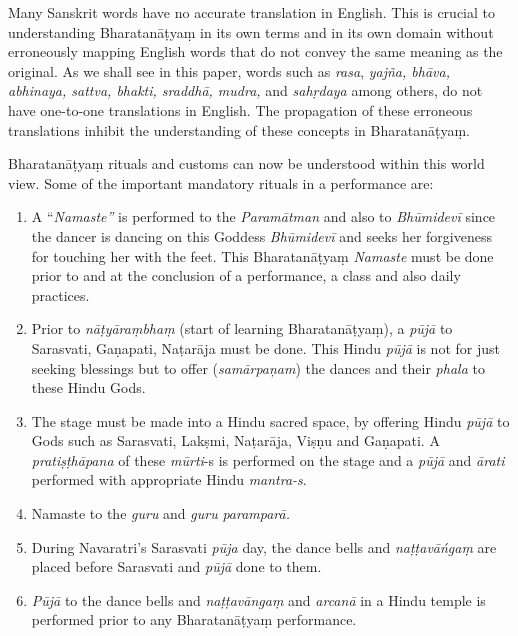 Many Sanskrit words have no accurate translation in English. This is crucial to understanding Bharatanāṭyaṃ in its own terms and in its own domain without erroneously mapping English words that do not convey the same meaning as the original. As we shall see in this paper, words such as \textit{rasa}, \textit{yajña, bhāva, abhinaya, sattva, bhakti, sraddhā, mudra,} and \textit{sahṛdaya} among others, do not have one-to-one translations in English. The propagation of these erroneous translations inhibit the understanding of these concepts in Bharatanāṭyaṃ.

Bharatanāṭyaṃ rituals and customs can now be understood within this world view. Some of the important mandatory rituals in a performance are:

\begin{enumerate}[{\rm 1)}]
\itemsep=0pt
\item A “\textit{Namaste”} is performed to the \textit{Paramātman }and also to \textit{Bhūmidevī} since the dancer is dancing on this Goddess \textit{Bhūmidevī} and seeks her forgiveness for touching her with the feet. This Bharatanāṭyaṃ \textit{Namaste }must be done prior to and at the conclusion of a performance, a class and also daily practices.

 \item Prior to \textit{nāṭyāraṃbhaṃ }(start of learning Bharatanāṭyaṃ), a \textit{pūjā }to Sarasvati, Gaṇapati, Naṭarāja must be done. This Hindu \textit{pūjā }is not for just seeking blessings but to offer (\textit{samārpaņam}) the dances and their \textit{phala }to these Hindu Gods.

 \item The stage must be made into a Hindu sacred space, by offering Hindu \textit{pūjā }to Gods such as Sarasvati, Lakṣmi, Naṭarāja, Viṣṇu and Gaṇapati. A \textit{pratiṣṭhāpana }of these \textit{mūrti}-s is performed on the stage and a \textit{pūjā }and \textit{ārati} performed with appropriate Hindu \textit{mantra-s}.

 \item Namaste to the \textit{guru} and \textit{guru} \textit{paramparā.}

 \item During Navaratri’s Sarasvati \textit{pūja} day, the dance bells and \textit{naṭṭavāńgaṃ} are placed before Sarasvati and \textit{pūjā }done to them.

 \item \textit{Pūjā} to the dance bells and \textit{naṭṭavāngaṃ} and \textit{arcanā} in a Hindu temple is performed prior to any Bharatanāṭyaṃ performance.

\end{enumerate}

